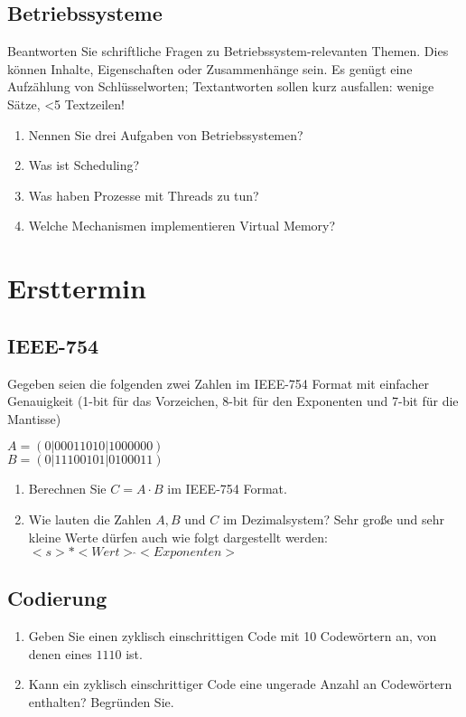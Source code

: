 \documentclass{exercisesheet}
\begin{document}
    \setcounter{subsection}{13}
    \subsection{Betriebssysteme}
      Beantworten Sie schriftliche Fragen zu Betriebssystem-relevanten Themen. Dies können Inhalte, Eigenschaften oder Zusammenhänge sein. Es genügt eine Aufzählung von Schlüsselworten; Textantworten sollen kurz ausfallen: wenige Sätze, <5 Textzeilen!
      \begin{enumerate}
        \item Nennen Sie drei Aufgaben von Betriebssystemen?
        \item Was ist Scheduling?
        \item Was haben Prozesse mit Threads zu tun?
        \item Welche Mechanismen implementieren Virtual Memory?
      \end{enumerate}

  \section{Ersttermin}
    \setcounter{subsection}{3}
    \subsection{IEEE-754}
      Gegeben seien die folgenden zwei Zahlen im IEEE-754 Format mit einfacher Genauigkeit (1-bit für das Vorzeichen, 8-bit für den Exponenten und 7-bit für die Mantisse)
      \begin{center}
        $A = (0|00011010|1000000)$\\
        $B = (0|11100101|0100011)$
      \end{center}
      \begin{enumerate}
        \item Berechnen Sie $C = A \cdot B$ im IEEE-754 Format.
        \item Wie lauten die Zahlen $A, B$ und $C$ im Dezimalsystem? Sehr große und sehr kleine Werte dürfen auch wie folgt dargestellt werden: $<s>*<Wert> \hat{} <Exponenten>$
      \end{enumerate}

    \subsection{Codierung}
      \begin{enumerate}
        \item Geben Sie einen zyklisch einschrittigen Code mit 10 Codewörtern an, von denen eines $1110$ ist.
        \item Kann ein zyklisch einschrittiger Code eine ungerade Anzahl an Codewörtern enthalten? Begründen Sie.
      \end{enumerate}
\end{document}

